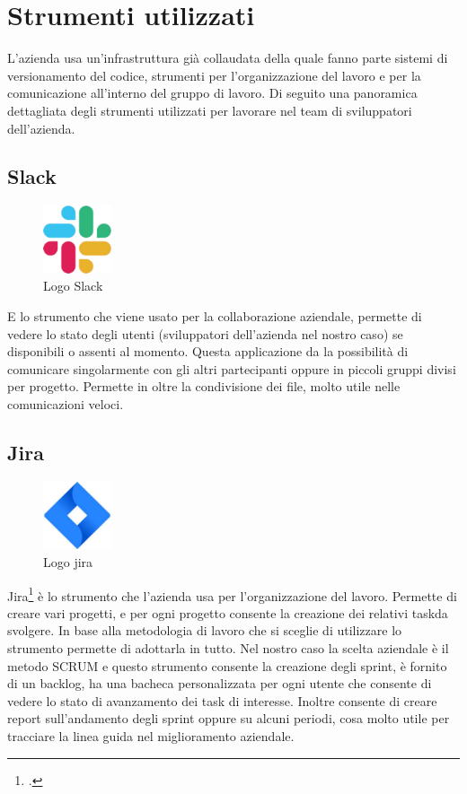 \section{Strumenti utilizzati}
L'azienda usa un'infrastruttura già collaudata della quale fanno parte sistemi di versionamento del codice, strumenti per l'organizzazione del lavoro e per la comunicazione all'interno del gruppo di lavoro.
Di seguito una panoramica dettagliata degli strumenti utilizzati per lavorare nel team di sviluppatori dell'azienda.

\subsection*{Slack}
\begin{figure}[H]
  \centering
  \includegraphics[width=2cm]{immagini/logo-Slack.jpg}
  \caption{Logo Slack}
\end{figure}
E lo strumento che viene usato per la collaborazione aziendale, permette di vedere lo stato degli utenti (sviluppatori dell'azienda
nel nostro caso) se disponibili o assenti al momento. Questa applicazione da la possibilità di comunicare singolarmente con gli altri
partecipanti oppure in piccoli gruppi divisi per progetto. Permette in oltre la condivisione dei file, molto utile nelle
comunicazioni veloci.

\subsection*{Jira}
\begin{figure}[H]
  \centering
  \includegraphics[width=2cm]{immagini/logo-jira.jpg}
  \caption{Logo jira}
\end{figure}
Jira\footcite{site:jira} è lo strumento che l'azienda usa per l'organizzazione del lavoro. Permette di creare vari progetti, e per ogni progetto consente la
creazione dei relativi \gls{task}\glsfirstoccur da svolgere. In base alla metodologia di lavoro che si sceglie di utilizzare lo strumento permette di adottarla in tutto.
Nel nostro caso la scelta aziendale è il metodo SCRUM e questo strumento consente la creazione degli sprint, è fornito di un backlog, ha
una bacheca personalizzata per ogni utente che consente di vedere lo stato di avanzamento dei task di interesse. Inoltre consente di creare
report sull'andamento degli sprint oppure su alcuni periodi, cosa molto utile per tracciare la linea guida nel miglioramento aziendale.


